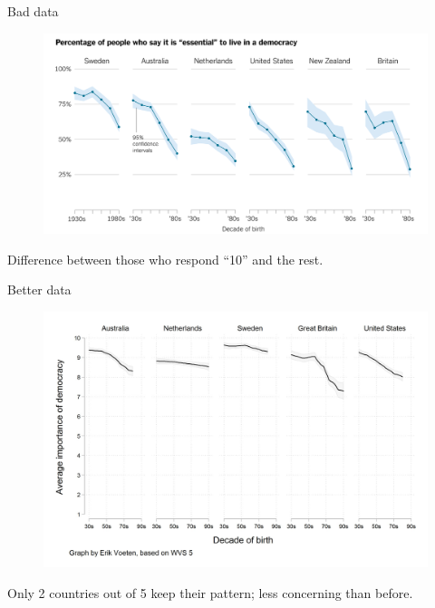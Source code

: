 \documentclass[12pt,english,pdf,dvipsnames,handout]{beamer}
\begin{document}
\begin{frame}{Bad data}

\begin{figure}
	\centering
	\includegraphics[scale=0.3]{../04-graphs/25_Democracy_danger}
\end{figure}

Difference between those who respond ``10'' and the rest.

\end{frame}



\begin{frame}{Better data}

\begin{figure}
	\centering
	\includegraphics[scale=0.115]{../04-graphs/26_Democracy_safe}
\end{figure}

Only 2 countries out of 5 keep their pattern; less concerning than before.
\end{frame}
\end{document}
